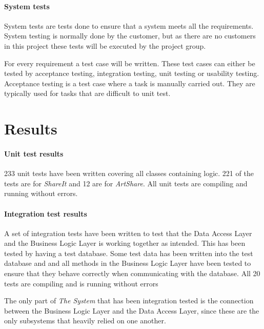 \documentclass[../report.tex]{subfiles}
\begin{document}
\paragraph{System tests}
System tests are tests done to ensure that a system meets all the requirements. System testing is normally done by the customer, but as there are no customers in this project these tests will be executed by the project group.

For every requirement a test case will be written. These test cases can either be tested by acceptance testing, integration testing, unit testing or usability testing. Acceptance testing is a test case where a task is manually carried out. They are typically used for tasks that are difficult to unit test. 

\section{Results}

\paragraph{Unit test results}

233 unit tests have been written covering all classes containing logic. 221 of the tests are for \textit{ShareIt} and 12 are for \textit{ArtShare}. All unit tests are compiling and running without errors.

\paragraph{Integration test results}

A set of integration tests have been written to test that the Data Access Layer and the Business Logic Layer is working together as intended. This has been tested by having a test database. Some test data has been written into the test database and and all methods in the Business Logic Layer have been tested to ensure that they behave correctly when communicating with the database. All 20 tests are compiling and is running without errors

The only part of \textit{The System} that has been integration tested is the connection between the Business Logic Layer and the Data Access Layer, since these are the only subsystems that heavily relied on one another.
\end{document}
